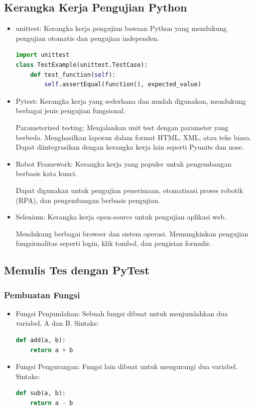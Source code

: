 \documentclass{article}
\begin{document}
\subsection{Kerangka Kerja Pengujian Python}
\begin{itemize}
    \item unittest: Kerangka kerja pengujian bawaan Python yang mendukung pengujian otomatis dan pengujian independen.

          \begin{lstlisting}[language=Python, caption={}, captionpos=b]
import unittest
class TestExample(unittest.TestCase):
    def test_function(self):
        self.assertEqual(function(), expected_value)
\end{lstlisting}
    \item Pytest: Kerangka kerja yang sederhana dan mudah digunakan, mendukung berbagai jenis pengujian fungsional.

          Parameterized testing: Menjalankan unit test dengan parameter yang berbeda.
          Menghasilkan laporan dalam format HTML, XML, atau teks biasa.
          Dapat diintegrasikan dengan kerangka kerja lain seperti Pyunits dan nose.
    \item Robot Framework: Kerangka kerja yang populer untuk pengembangan berbasis kata kunci.

          Dapat digunakan untuk pengujian penerimaan, otomatisasi proses robotik (RPA), dan pengembangan berbasis pengujian.
    \item Selenium: Kerangka kerja open-source untuk pengujian aplikasi web.

          Mendukung berbagai browser dan sistem operasi. Memungkinkan pengujian fungsionalitas seperti login, klik tombol, dan pengisian formulir.
\end{itemize}

\subsection{Menulis Tes dengan PyTest}
\subsubsection{Pembuatan Fungsi}
\begin{itemize}
    \item Fungsi Penjumlahan: Sebuah fungsi dibuat untuk menjumlahkan dua variabel, A dan B.
          Sintaks:
          \begin{lstlisting}[language=Python, caption={}, captionpos=b]
def add(a, b):
    return a + b
\end{lstlisting}
    \item Fungsi Pengurangan: Fungsi lain dibuat untuk mengurangi dua variabel.
          Sintaks:
          \begin{lstlisting}[language=Python, caption={}, captionpos=b]
def sub(a, b):
    return a - b
\end{lstlisting}
\end{itemize}
\end{document}
